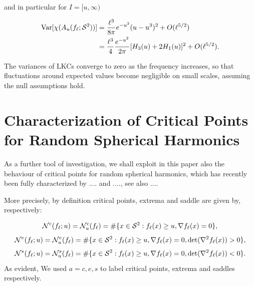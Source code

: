 \documentclass[aps,prd,showpacs,superscriptaddress,groupedaddress]{revtex4-1}  %
\begin{document}
\noindent and in particular for $I=[u,\infty)$

\begin{align*}
\text{Var}[\chi (A_{u}(f_{\ell }; {\cal S}^2) )]&= \frac{\ell^3}{8 \pi }  e^{- u^2  }   (u-u^3)^2  +O(\ell^{5/2})\\
&=\frac{\ell^3 }{4 } 
 \frac{e^{-u^2}}{2\pi} [H_3(u)+2H_1(u) ]^2  +O(\ell^{5/2}).
\end{align*}

The variances of LKCs converge to zero as the frequency increases,
so that fluctuations around expected values become negligible on
small scales, assuming the null assumptions hold. 

\section{Characterization of Critical Points for Random Spherical Harmonics}

As a further tool of investigation, we shall exploit in this paper also the behaviour of critical points for random spherical harmonics, which has recently been fully characterized by .... and ...., see also ....

More precisely, by definition critical points, extrema and saddle are given by, respectively:

\begin{equation*}
\mathcal{N}^{c}(f_\ell;u )=\mathcal{N}_{u}^{c}(f_{\ell })=\#\{x\in {\cal S}^2
:f_{\ell }(x)\geq u,\nabla f_{\ell }(x)=0\},
\end{equation*}
\begin{equation*}
\mathcal{N}^{e}(f_\ell;u)=\mathcal{N}_{u}^{e}(f_{\ell })=\#\{x\in {\cal S}^2
:f_{\ell }(x)\geq u,\nabla f_{\ell }(x)=0,\text{det}(\nabla ^{2}f_{\ell
}(x))>0\},
\end{equation*}
\begin{equation*}
\mathcal{N}^{s}(f_\ell;u)=\mathcal{N}_{u}^{s}(f_{\ell })=\#\{x\in {\cal S}^2
:f_{\ell }(x)\geq u,\nabla f_{\ell }(x)=0,\text{det}(\nabla ^{2}f_{\ell
}(x))<0\}.
\end{equation*}%
As evident, We used $a=c,e,s$ to label critical points, extrema and saddles respectively. \\

\end{document}
